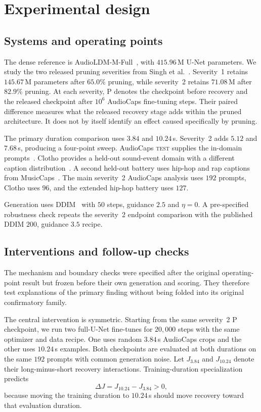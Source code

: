 \section{Experimental design}
\subsection{Systems and operating points}
The dense reference is AudioLDM-M-Full~\cite{liu2023audioldm}, with $415.96$\,M U-Net parameters. We study the two released pruning severities from Singh et al.~\cite{singh2026pruning}. Severity~1 retains $145.67$\,M parameters after $65.0\%$ pruning, while severity~2 retains $71.08$\,M after $82.9\%$ pruning. At each severity, P denotes the checkpoint before recovery and \PFT{} the released checkpoint after $10^{6}$ AudioCaps fine-tuning steps. Their paired difference measures what the released recovery stage adds within the pruned architecture. It does not by itself identify an effect caused specifically by pruning.

The primary duration comparison uses $3.84$ and $10.24$\,s. Severity~2 adds $5.12$ and $7.68$\,s, producing a four-point sweep. AudioCaps \textsc{test} supplies the in-domain prompts~\cite{kim2019audiocaps}. Clotho provides a held-out sound-event domain with a different caption distribution~\cite{drossos2020clotho}. A second held-out battery uses hip-hop and rap captions from MusicCaps~\cite{agostinelli2023musiclm}. The main severity~2 AudioCaps analysis uses $192$ prompts, Clotho uses $96$, and the extended hip-hop battery uses $127$.

Generation uses DDIM~\cite{song2021ddim} with $50$ steps, guidance $2.5$ and $\eta=0$. A pre-specified robustness check repeats the severity~2 endpoint comparison with the published DDIM $200$, guidance $3.5$ recipe.

\subsection{Interventions and follow-up checks}
The mechanism and boundary checks were specified after the original operating-point result but frozen before their own generation and scoring. They therefore test explanations of the primary finding without being folded into its original confirmatory family.

The central intervention is symmetric. Starting from the same severity~2 P checkpoint, we run two full-U-Net fine-tunes for $20{,}000$ steps with the same optimizer and data recipe. One uses random $3.84$\,s AudioCaps crops and the other uses $10.24$\,s examples. Both checkpoints are evaluated at both durations on the same $192$ prompts with common generation noise. Let $J_{3.84}$ and $J_{10.24}$ denote their long-minus-short recovery interactions. Training-duration specialization predicts
\begin{equation}
\Delta J = J_{10.24}-J_{3.84}>0,
\end{equation}
because moving the training duration to $10.24$\,s should move recovery toward that evaluation duration.

